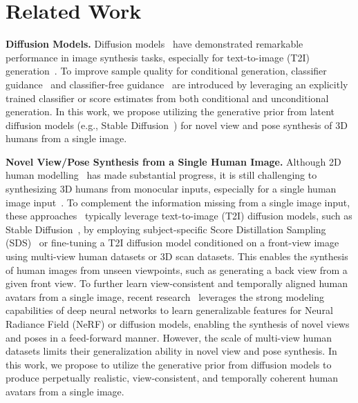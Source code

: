 \section{Related Work}

\noindent \textbf{Diffusion Models.}
Diffusion models~\cite{sohl2015deep, ho2020denoising} have demonstrated remarkable performance in image synthesis tasks, especially for text-to-image (T2I) generation~\cite{balaji2022ediff, nichol2021glide, saharia2022photorealistic, ramesh2022hierarchical, huang2023composer, rombach2022high}.
To improve sample quality for conditional generation, classifier guidance~\cite{dhariwal2021diffusion} and classifier-free guidance~\cite{ho2022classifier} are introduced by leveraging an explicitly trained classifier or score estimates from both conditional and unconditional generation. 
In this work, we propose utilizing the generative prior from latent diffusion models (e.g., Stable Diffusion~\cite{rombach2022high}) for novel view and pose synthesis of 3D humans from a single image.

\noindent \textbf{Novel View/Pose Synthesis from a Single Human Image.}
Although 2D human modelling~\cite{albahar2021pose, lewis2021tryongan, sarkar2021humangan, men2020controllable, fu2022stylegan, jiang2022text2human, jiang2023text2performer, fu2023unitedhuman} has made substantial progress, it is still challenging to synthesizing 3D humans from monocular inputs, especially for a single human image input~\cite{saito2019pifu, saito2020pifuhd, he2020geo, li2020robust, dong2022pina, li2020monocular, bozic2021neural, yang2021s3, bhatnagar2020combining, bhatnagar2020loopreg, huang2020arch, he2021arch++, zheng2021pamir, xiu2022icon, xiu2022econ, alldieck2022photorealistic, corona2022structured}.
To complement the information missing from a single image input, these approaches~\cite{weng2023zeroavatar, huang2023tech, pan2024humansplat, wang2024geneman, chen2024generalizable, choi2022mononhr, zhang2024sifu, ho2024sith, dong2023ivs, cha2023generating, casas2023smplitex} typically leverage text-to-image (T2I) diffusion models, such as Stable Diffusion~\cite{rombach2021highresolution}, by employing subject-specific Score Distillation Sampling (SDS)~\cite{poole2022dreamfusion} or fine-tuning a T2I diffusion model conditioned on a front-view image using multi-view human datasets or 3D scan datasets. 
This enables the synthesis of human images from unseen viewpoints, such as generating a back view from a given front view.
To further learn view-consistent and temporally aligned human avatars from a single image, recent research~\cite{hu2023sherf, shao2024360} leverages the strong modeling capabilities of deep neural networks to learn generalizable features for Neural Radiance Field (NeRF) or diffusion models, enabling the synthesis of novel views and poses in a feed-forward manner. 
However, the scale of multi-view human datasets limits their generalization ability in novel view and pose synthesis.
In this work, we propose to utilize the generative prior from diffusion models to produce perpetually realistic, view-consistent, and temporally coherent human avatars from a single image.

